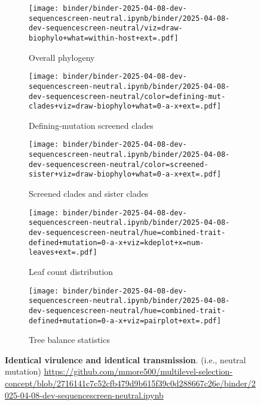 \begin{figure*}[htbp]
  \centering
  \begin{subfigure}{0.32\textwidth}
    \centering
    \texttt{[image: binder/binder-2025-04-08-dev-sequencescreen-neutral.ipynb/binder/2025-04-08-dev-sequencescreen-neutral/viz=draw-biophylo+what=within-host+ext=.pdf]}
    \caption{Overall phylogeny}
    \label{fig:dev-sequencescreen-neutral:overall_phylogeny}
  \end{subfigure}
  \hfill
  \begin{subfigure}{0.32\textwidth}
    \centering
    \texttt{[image: binder/binder-2025-04-08-dev-sequencescreen-neutral.ipynb/binder/2025-04-08-dev-sequencescreen-neutral/color=defining-mut-clades+viz=draw-biophylo+what=0-a-x+ext=.pdf]}
    \caption{Defining-mutation screened clades}
    \label{fig:dev-sequencescreen-neutral:defining_mut_clades}
  \end{subfigure}
  \hfill
  \begin{subfigure}{0.32\textwidth}
    \centering
    \texttt{[image: binder/binder-2025-04-08-dev-sequencescreen-neutral.ipynb/binder/2025-04-08-dev-sequencescreen-neutral/color=screened-sister+viz=draw-biophylo+what=0-a-x+ext=.pdf]}
    \caption{Screened clades and sister clades}
    \label{fig:dev-sequencescreen-neutral:screened_sister}
  \end{subfigure}

  \vspace{0.5cm} %

  \begin{subfigure}{0.54\textwidth}
    \centering
    \texttt{[image: binder/binder-2025-04-08-dev-sequencescreen-neutral.ipynb/binder/2025-04-08-dev-sequencescreen-neutral/hue=combined-trait-defined+mutation=0-a-x+viz=kdeplot+x=num-leaves+ext=.pdf]}
    \caption{Leaf count distribution}
    \label{fig:dev-sequencescreen-neutral:leaf_count}
  \end{subfigure}
  \hfill
  \begin{subfigure}{0.44\textwidth}
    \centering
    \texttt{[image: binder/binder-2025-04-08-dev-sequencescreen-neutral.ipynb/binder/2025-04-08-dev-sequencescreen-neutral/hue=combined-trait-defined+mutation=0-a-x+viz=pairplot+ext=.pdf]}
    \caption{Tree balance statistics}
    \label{fig:dev-sequencescreen-neutral:tree_balance}
  \end{subfigure}

  \caption{\textbf{Identical virulence and identical transmission}. (i.e., neutral mutation) \url{https://github.com/mmore500/multilevel-selection-concept/blob/2716141c7c52cfb479d9b615f39c0d288667c26e/binder/2025-04-08-dev-sequencescreen-neutral.ipynb}}
  \label{fig:dev-sequencescreen-neutral}
\end{figure*}
